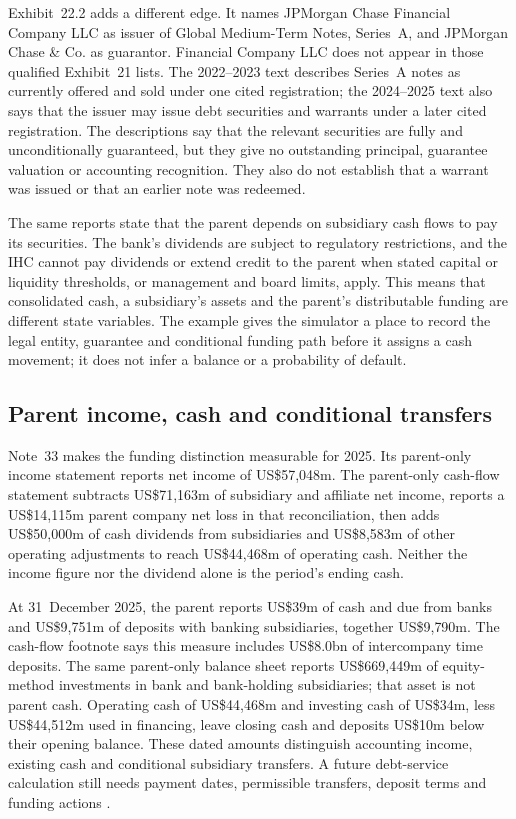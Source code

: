 Exhibit~22.2 adds a different edge. It names JPMorgan Chase Financial Company
LLC as issuer of Global Medium-Term Notes, Series~A, and JPMorgan Chase \& Co.
as guarantor. Financial Company LLC does not appear in those qualified
Exhibit~21 lists. The 2022--2023 text describes Series~A notes as currently
offered and sold under one cited registration; the 2024--2025 text also says
that the issuer may issue debt securities and warrants under a later cited
registration. The descriptions say that the relevant securities are fully and
unconditionally guaranteed, but they give no outstanding principal, guarantee
valuation or accounting recognition. They also do not establish that a warrant
was issued or that an earlier note was redeemed.

The same reports state that the parent depends on subsidiary cash flows to pay
its securities. The bank's dividends are subject to regulatory restrictions,
and the IHC cannot pay dividends or extend credit to the parent when stated
capital or liquidity thresholds, or management and board limits, apply. This
means that consolidated cash, a subsidiary's assets and the parent's
distributable funding are different state variables. The example gives the
simulator a place to record the legal entity, guarantee and conditional funding
path before it assigns a cash movement; it does not infer a balance or a
probability of default.

\subsection{Parent income, cash and conditional transfers}
\label{sec:bank-parent-funding}

Note~33 makes the funding distinction measurable for 2025. Its parent-only
income statement reports net income of US\$57{,}048m. The parent-only cash-flow
statement subtracts US\$71{,}163m of subsidiary and affiliate net income,
reports a US\$14{,}115m parent company net loss in that reconciliation, then
adds US\$50{,}000m of cash dividends from subsidiaries and US\$8{,}583m of
other operating adjustments to reach US\$44{,}468m of operating cash. Neither
the income figure nor the dividend alone is the period's ending cash.

At 31~December 2025, the parent reports US\$39m of cash and due from banks and
US\$9{,}751m of deposits with banking subsidiaries, together US\$9{,}790m.
The cash-flow footnote says this measure includes US\$8.0bn of intercompany
time deposits. The same parent-only balance sheet reports US\$669{,}449m of
equity-method investments in bank and bank-holding subsidiaries; that asset is
not parent cash. Operating cash of US\$44{,}468m and investing cash of
US\$34m, less US\$44{,}512m used in financing, leave closing cash and
deposits US\$10m below their opening balance.
These dated amounts distinguish accounting income, existing cash and
conditional subsidiary transfers. A future debt-service calculation still
needs payment dates, permissible transfers, deposit terms and funding actions
\citep[pp.~19, 310--311]{jpmorgan2025tenk}.

